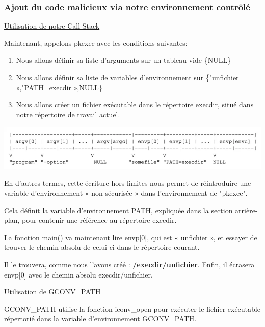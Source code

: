 \documentclass[12pt,a4paper]{article}
\begin{document}
\begin{flushleft}
                \subsubsection{Ajout du code malicieux via notre environnement contrôlé}
                \item \underline{Utilisation de notre Call-Stack}
                     \item Maintenant, appelons pkexec avec les conditions suivantes:
                     \begin{enumerate}
                         \item Nous allons définir sa liste d’arguments sur un tableau vide \{NULL\}
                         \item Nous allons définir sa liste de variables d’environnement sur \{"unfichier »,"PATH=execdir »,NULL\}
                         \item Nous allons créer un fichier exécutable dans le répertoire execdir, situé dans notre répertoire de travail actuel.
                     \end{enumerate}
                 \begin{center}
                    \includegraphics[scale=0.4]{image} \cite{CVE2021425:online}
                 \end{center}
                \item En d'autres termes, cette écriture hors limites nous permet de réintroduire une variable d’environnement « non sécurisée » dans l'environnement de "pkexec".
                \item Cela définit la variable d’environnement PATH, expliquée dans la section arrière-plan, pour contenir une référence au répertoire execdir. 
                \item La fonction main() va maintenant lire envp[0], qui est « unfichier », et essayer de trouver le chemin absolu de celui-ci dans le répertoire courant. 
                \item Il le trouvera, comme nous l’avons créé :  \textbf{/execdir/unfichier}. Enfin, il écrasera envp[0] avec le chemin absolu execdir/unfichier.
            \item \underline{Utilisation de GCONV\_PATH}
            \item GCONV\_PATH utilise la fonction iconv\_open pour exécuter le fichier exécutable répertorié dans la variable d’environnement GCONV\_PATH.

\end{flushleft}
\end{document}
